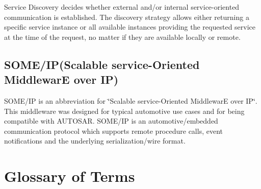  Service Discovery decides whether external and/or internal service-\/oriented communication is established. The discovery strategy allows either returning a specific service instance or all available instances providing the requested service at the time of the request, no matter if they are available locally or remote. \hypertarget{adaptive_communicationmanagement_someip}{}\subsection{S\+O\+M\+E/\+IP(Scalable service-\/\+Oriented MiddlewarE over IP)}\label{adaptive_communicationmanagement_someip}
S\+O\+M\+E/\+IP is an abbreviation for \char`\"{}\+Scalable service-\/\+Oriented Middlewar\+E over I\+P\char`\"{}. This middleware was designed for typical automotive use cases and for being compatible with A\+U\+T\+O\+S\+AR. S\+O\+M\+E/\+IP is an automotive/embedded communication protocol which supports remote procedure calls, event notifications and the underlying serialization/wire format.

\section*{Glossary of Terms}

